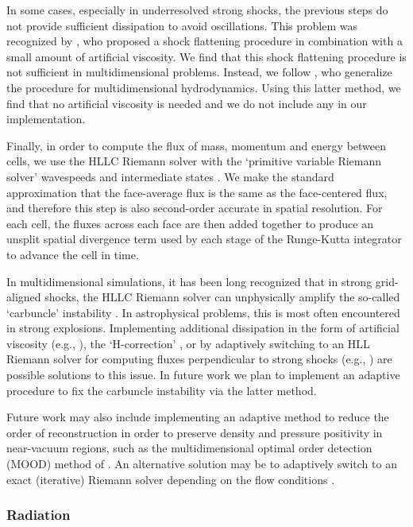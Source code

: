 \documentclass[fleqn,usenatbib]{mnras}
\providecommand{\DIFadd}[1]{{\protect\color{blue}\uwave{#1}}} %
\providecommand{\DIFaddbegin}{} %
\providecommand{\DIFaddend}{} %
\newcommand{\DIFaddincludegraphics}[2][]{{\color{blue}\fbox{\DIFOincludegraphics[#1]{#2}}}} %
\DeclareRobustCommand{\DIFaddbegin}{\DIFOaddbegin \let\includegraphics\DIFaddincludegraphics} %
\DeclareRobustCommand{\DIFaddend}{\DIFOaddend \let\includegraphics\DIFOincludegraphics} %
\begin{document}
In some cases, especially in underresolved strong shocks, the previous steps do not provide sufficient dissipation to avoid oscillations. This problem was recognized by , who proposed a shock flattening procedure in combination with a small amount of artificial viscosity. We find that this shock flattening procedure is not sufficient in multidimensional problems. Instead, we follow \cite{Miller_2002}, who generalize the  \DIFaddbegin \DIFadd{shock-flattening }\DIFaddend procedure for multidimensional hydrodynamics. Using this latter method, we find that no artificial viscosity is needed and we do not include any in our implementation.

Finally, in order to compute the flux of mass, momentum and energy between cells, we use the HLLC Riemann solver with the `primitive variable Riemann solver' wavespeeds and intermediate states \citep{Toro_2013}. We make the standard approximation that the face-average flux is the same as the face-centered flux, and therefore this step is also second-order accurate in spatial resolution. For each cell, the fluxes across each face are then added together to produce an unsplit spatial divergence term used by each stage of the Runge-Kutta integrator to advance the cell in time.

In multidimensional simulations, it has been long recognized that in strong grid-aligned shocks, the HLLC Riemann solver can unphysically amplify the so-called `carbuncle' instability \citep{Quirk_1994}. In astrophysical problems, this is most often encountered in strong explosions. Implementing additional dissipation in the form of artificial viscosity (e.g., \citealt{Gittings_2008}), the `H-correction' \citep{Sanders_1998}, or by adaptively switching to an HLL Riemann solver \citep{Harten_1983} for computing fluxes perpendicular to strong shocks (e.g., \citealt{Quirk_1994,Skinner_2019}) are possible solutions to this issue. In future work we plan to implement an adaptive procedure to fix the carbuncle instability via the latter method.

Future work may also include implementing an adaptive method to reduce the order of reconstruction in order to preserve density and pressure positivity in near-vacuum regions, such as the multidimensional optimal order detection (MOOD) method of \cite{Clain_2011}. An alternative solution may be to adaptively switch to an exact (iterative) Riemann solver depending on the flow conditions \citep{Toro_2013}.

\subsubsection{Radiation}
\label{sssec:radiation}
\end{document}
